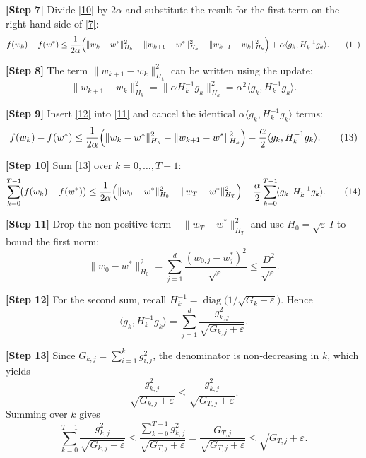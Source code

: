 \documentclass{article}
\begin{document}
\noindent\textbf{[Step 7]}  Divide \eqref{10} by $2\alpha$ and substitute the result for the first term on the right‑hand side of \eqref{7}:
\[
f(w_{k})-f(w^{*})
   \le\frac{1}{2\alpha}\Bigl(
        \|w_{k}-w^{*}\|_{H_{k}}^{2}
       -\|w_{k+1}-w^{*}\|_{H_{k}}^{2}
       -\|w_{k+1}-w_{k}\|_{H_{k}}^{2}
        \Bigr)
      +\alpha\langle g_{k},H_{k}^{-1}g_{k}\rangle .
\tag{11}
\]

\noindent\textbf{[Step 8]}  The term $\|w_{k+1}-w_{k}\|_{H_{k}}^{2}$ can be written using the update:
\[
\|w_{k+1}-w_{k}\|_{H_{k}}^{2}
   =\|\alpha H_{k}^{-1}g_{k}\|_{H_{k}}^{2}
   =\alpha^{2}\langle g_{k},H_{k}^{-1}g_{k}\rangle .
\tag{12}
\]

\noindent\textbf{[Step 9]}  Insert \eqref{12} into \eqref{11} and cancel the identical $\alpha\langle g_{k},H_{k}^{-1}g_{k}\rangle$ terms:
\[
f(w_{k})-f(w^{*})
   \le\frac{1}{2\alpha}
        \Bigl(
          \|w_{k}-w^{*}\|_{H_{k}}^{2}
         -\|w_{k+1}-w^{*}\|_{H_{k}}^{2}
        \Bigr)
      -\frac{\alpha}{2}\langle g_{k},H_{k}^{-1}g_{k}\rangle .
\tag{13}
\]

\noindent\textbf{[Step 10]}  Sum \eqref{13} over $k=0,\dots,T-1$:
\[
\sum_{k=0}^{T-1}\!\bigl(f(w_{k})-f(w^{*})\bigr)
   \le\frac{1}{2\alpha}
        \Bigl(
          \|w_{0}-w^{*}\|_{H_{0}}^{2}
         -\|w_{T}-w^{*}\|_{H_{T}}^{2}
        \Bigr)
      -\frac{\alpha}{2}\sum_{k=0}^{T-1}\!\langle g_{k},H_{k}^{-1}g_{k}\rangle .
\tag{14}
\]

\noindent\textbf{[Step 11]}  Drop the non‑positive term $-\|w_{T}-w^{*}\|_{H_{T}}^{2}$ and use $H_{0}= \sqrt{\varepsilon}\,I$ to bound the first norm:
\[
\|w_{0}-w^{*}\|_{H_{0}}^{2}
   =\sum_{j=1}^{d}\frac{(w_{0,j}-w^{*}_{j})^{2}}{\sqrt{\varepsilon}}
   \le \frac{D^{2}}{\sqrt{\varepsilon}} .
\tag{15}
\]

\noindent\textbf{[Step 12]}  For the second sum, recall $H_{k}^{-1}=\operatorname{diag}\bigl(1/\sqrt{G_{k}+\varepsilon}\bigr)$. Hence
\[
\langle g_{k},H_{k}^{-1}g_{k}\rangle
   =\sum_{j=1}^{d}\frac{g_{k,j}^{2}}{\sqrt{G_{k,j}+\varepsilon}} .
\tag{16}
\]

\noindent\textbf{[Step 13]}  Since $G_{k,j}= \sum_{i=1}^{k}g_{i,j}^{2}$, the denominator is non‑decreasing in $k$, which yields
\[
\frac{g_{k,j}^{2}}{\sqrt{G_{k,j}+\varepsilon}}
   \le\frac{g_{k,j}^{2}}{\sqrt{G_{T,j}+\varepsilon}} .
\tag{17}
\]
Summing over $k$ gives
\[
\sum_{k=0}^{T-1}\frac{g_{k,j}^{2}}{\sqrt{G_{k,j}+\varepsilon}}
   \le\frac{\sum_{k=0}^{T-1}g_{k,j}^{2}}{\sqrt{G_{T,j}+\varepsilon}}
   =\frac{G_{T,j}}{\sqrt{G_{T,j}+\varepsilon}}
   \le\sqrt{G_{T,j}+\varepsilon} .
\tag{18}
\]
\end{document}
